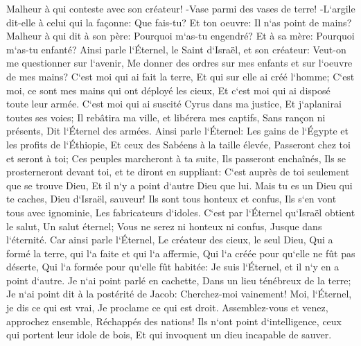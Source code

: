 \verse Malheur à qui conteste avec son créateur! -Vase parmi des vases de terre! -L`argile dit-elle à celui qui la façonne: Que fais-tu? Et ton oeuvre: Il n`as point de mains? 
\verse Malheur à qui dit à son père: Pourquoi m`as-tu engendré? Et à sa mère: Pourquoi m`as-tu enfanté? 
\verse Ainsi parle l`Éternel, le Saint d`Israël, et son créateur: Veut-on me questionner sur l`avenir, Me donner des ordres sur mes enfants et sur l`oeuvre de mes mains? 
\verse C`est moi qui ai fait la terre, Et qui sur elle ai créé l`homme; C`est moi, ce sont mes mains qui ont déployé les cieux, Et c`est moi qui ai disposé toute leur armée. 
\verse C`est moi qui ai suscité Cyrus dans ma justice, Et j`aplanirai toutes ses voies; Il rebâtira ma ville, et libérera mes captifs, Sans rançon ni présents, Dit l`Éternel des armées. 
\verse Ainsi parle l`Éternel: Les gains de l`Égypte et les profits de l`Éthiopie, Et ceux des Sabéens à la taille élevée, Passeront chez toi et seront à toi; Ces peuples marcheront à ta suite, Ils passeront enchaînés, Ils se prosterneront devant toi, et te diront en suppliant: C`est auprès de toi seulement que se trouve Dieu, Et il n`y a point d`autre Dieu que lui. 
\verse Mais tu es un Dieu qui te caches, Dieu d`Israël, sauveur! 
\verse Ils sont tous honteux et confus, Ils s`en vont tous avec ignominie, Les fabricateurs d`idoles. 
\verse C`est par l`Éternel qu`Israël obtient le salut, Un salut éternel; Vous ne serez ni honteux ni confus, Jusque dans l`éternité. 
\verse Car ainsi parle l`Éternel, Le créateur des cieux, le seul Dieu, Qui a formé la terre, qui l`a faite et qui l`a affermie, Qui l`a créée pour qu`elle ne fût pas déserte, Qui l`a formée pour qu`elle fût habitée: Je suis l`Éternel, et il n`y en a point d`autre. 
\verse Je n`ai point parlé en cachette, Dans un lieu ténébreux de la terre; Je n`ai point dit à la postérité de Jacob: Cherchez-moi vainement! Moi, l`Éternel, je dis ce qui est vrai, Je proclame ce qui est droit. 
\verse Assemblez-vous et venez, approchez ensemble, Réchappés des nations! Ils n`ont point d`intelligence, ceux qui portent leur idole de bois, Et qui invoquent un dieu incapable de sauver. 
